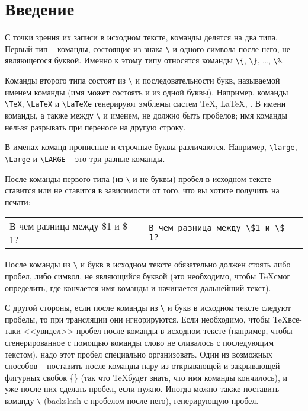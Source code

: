 \chapter{Введение}

С точки зрения их записи в исходном тексте, команды делятся на два типа. Первый тип -- команды, состоящие из знака \verb"\" и одного символа после него, не являющегося буквой. Именно к этому типу относятся команды \verb"\{", \verb"\}", \dots , \verb"\%".

Команды второго типа состоят из \verb"\" и последовательности букв, называемой именем команды (имя может состоять и из одной буквы). Например, команды \verb"\TeX", \verb"\LaTeX" и \verb"\LaTeXe" генерируют эмблемы систем \TeX, \LaTeX, \LaTeXe. В имени команды, а также между \verb"\" и именем, не должно быть пробелов; имя команды нельзя разрывать при переносе на другую строку.

В именах команд прописные и строчные буквы различаются. Например, \verb"\large", \verb"\Large" и \verb"\LARGE" -- это три разные команды.

После команды первого типа (из \verb"\" и не-буквы) пробел в исходном тексте ставится или не ставится в зависимости от того, что вы хотите получить на печати:

\quad
\begin{tabular}{ll}
	В чем разница между \$1 и \$ 1?&\verb"В чем разница между \$1 и \$ 1?"\\
\end{tabular}
\quad

После команды из \verb"\" и букв в исходном тексте обязательно должен стоять либо пробел, либо символ, не являющийся буквой (это необходимо, чтобы \TeX смог определить, где кончается имя команды и начинается дальнейший текст).

С другой стороны, если после команды из \verb"\" и букв в исходном тексте следуют пробелы, то при трансляции они игнорируются. Если необходимо, чтобы \TeX все-таки <<увидел>> пробел после команды в исходном тексте (например, чтобы сгенерированное с помощью команды слово не сливалось с последующим текстом), надо этот пробел специально организовать. Один из возможных способов -- поставить после команды пару из открывающей и закрывающей фигурных скобок \{\} (так что \TeX будет знать, что имя команды кончилось), и уже после них сделать пробел, если нужно. Иногда можно также поставить команду \verb"\" (backslash с пробелом после него), генерирующую пробел.
